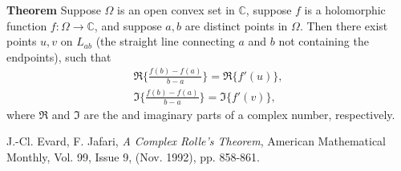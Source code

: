 \documentclass[12pt]{article}
\newcommand{\sC}[0]{\mathbb{C}}
\begin{document}
{\bf Theorem} \cite{evard}
 Suppose $\Omega$ is an open convex set in $\sC$,
 suppose $f$ is a holomorphic function $f:\Omega\to \sC$, and
 suppose $a,b$ are distinct points in $\Omega$.
 Then there exist points $u,v$ on $L_{ab}$ (the straight line
 connecting $a$ and $b$ not containing the endpoints), such that
\begin{eqnarray*}
\Re\{ \frac{f(b)-f(a)}{b-a} \} = \Re\{ f'(u) \}, \\
\Im\{ \frac{f(b)-f(a)}{b-a} \} = \Im\{ f'(v) \}, 
\end{eqnarray*}
where $\Re$ and $\Im$ are the  and imaginary parts of
a complex number, respectively.  
 
 \begin{thebibliography}{9}
  J.-Cl. Evard, F. Jafari,
 \emph{A Complex Rolle's Theorem},
 American Mathematical Monthly, Vol. 99, Issue 9, (Nov. 1992), pp. 858-861.
 \end{thebibliography}
\end{document}
